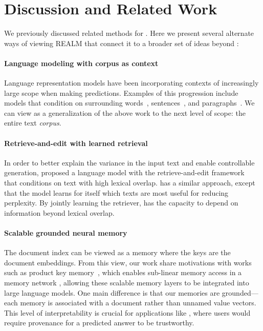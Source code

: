 \documentclass{article}
\begin{document}
 

\section{Discussion and Related Work}
We previously discussed related methods for \openqa.
Here we present several alternate ways of viewing REALM that connect it to a broader set of ideas beyond \openqa:

\paragraph{Language modeling with corpus as context}
Language representation models have been incorporating contexts of 
increasingly large scope when making predictions.
Examples of this progression include models that condition on surrounding words~\cite{skipgram, word2vec}, sentences~\cite{skipthought, elmo}, and paragraphs~\cite{gpt, bert}. We can view \thename as a generalization of the above work to the next level of scope: the entire text \emph{corpus}. 

\paragraph{Retrieve-and-edit with learned retrieval}
In order to better explain the variance in the input text and enable controllable generation, \citet{prototypes} proposed a language model with the retrieve-and-edit framework~\cite{retrieve_and_edit} that conditions on text with high lexical overlap. \thename has a similar approach, except that the model learns for itself which texts are most useful for reducing perplexity. By jointly learning the retriever, \thename has the capacity to depend on information beyond lexical overlap.

\paragraph{Scalable grounded neural memory}
The document index can be viewed as a memory where the keys are the document embeddings.
From this view, our work share motivations
with works such as product key memory~\cite{product_key},
which enables
sub-linear memory access in a memory network \cite{memory_networks,neural_turing,end_to_end_memory}, allowing these scalable memory layers to be integrated into large language models.
One main difference is that our memories are grounded---each memory is associated with a document rather than unnamed value vectors. This level of interpretability is crucial for applications like \openqa, where users would require provenance for a predicted answer to be trustworthy.
\end{document}
